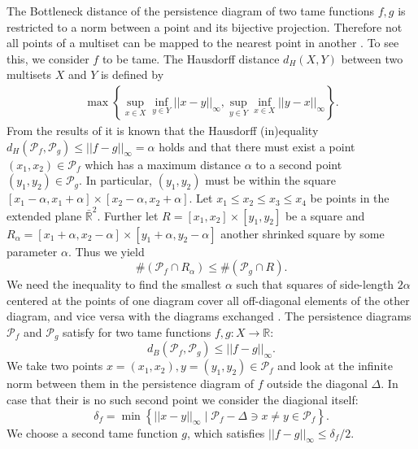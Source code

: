 \documentclass{article}
\begin{document}
The Bottleneck distance of the persistence diagram of two tame functions $f,g$ is restricted to a norm between a point and its bijective projection. Therefore not all points of a multiset can be mapped to the nearest point in another \cite{Cohen-SteinerEH07}. To see this, we consider $f$ to be tame. The Hausdorff distance $d_H(X,Y)$ between two multisets $X$ and $Y$ is defined by
\begin{align}
\max \left\{\sup_{x \in X} \inf_{y \in Y} ||x-y||_\infty, \sup_{y \in Y} \inf_{x \in X} ||y-x||_\infty \right\}.
\end{align}
From the results of \cite{CerriL16} it is known that the Hausdorff (in)equality $d_H(\mathcal{P}_f,\mathcal{P}_g) \leq ||f-g||_\infty = \alpha$ holds and that there must exist a point $(x_1,x_2) \in \mathcal{P}_f$ which has a maximum distance $\alpha$ to a second point $(y_1,y_2) \in \mathcal{P}_g$. In particular, $(y_1,y_2)$ must be within the square $[x_1 -\alpha, x_1 + \alpha] \times [x_2-\alpha, x_2+\alpha]$. Let $x_1 \leq x_2 \leq x_3 \leq x_4$ be points in the extended plane $\bar{\mathbb{R}}^2$. Further let $R = [x_1,x_2] \times [y_1,y_2]$ be a square and $R_\alpha = [x_1+\alpha,x_2-\alpha] \times [y_1+\alpha,y_2-\alpha]$ another shrinked square by some parameter $\alpha$. Thus we yield
\begin{equation}
\label{boxlemma}
\#\left( \mathcal{P}_f \cap R_\alpha \right) \leq \#\left(\mathcal{P}_g \cap R \right).
\end{equation}
We need the inequality to find the smallest $\alpha$ such that squares of side-length $2 \alpha$ centered at the points of one diagram cover all off-diagonal elements of the other diagram, and vice versa with the diagrams exchanged \cite{Cohen-SteinerEH07}. The persistence diagrams $\mathcal{P}_f$ and $\mathcal{P}_g$ satisfy for two tame functions $f,g: X \rightarrow \mathbb{R}$:
\begin{equation}
d_B\left(\mathcal{P}_f,\mathcal{P}_g\right) \leq ||f-g||_\infty.
\end{equation}
We take two points $x = (x_1,x_2), y=(y_1,y_2) \in \mathcal{P}_f$ and look at the infinite norm between them in the persistence diagram of $f$ outside the diagonal $\Delta$. In case that their is no such second point we consider the diagional itself:
\begin{equation}
\delta_f = \min\left\{ ||x-y||_\infty \; \bigg\vert \; \mathcal{P}_f-\Delta \ni x \neq y \in \mathcal{P}_f \right\}.
\end{equation}
We choose a second tame function $g$, which satisfies $||f-g||_\infty \leq \delta_f/2$.
\end{document}
